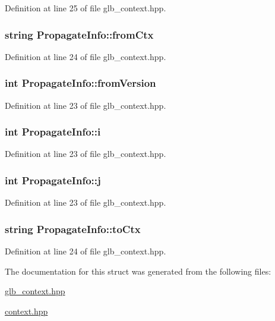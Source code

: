Definition at line 25 of file glb\_\-context.hpp.\hypertarget{struct_propagate_info_a8d941df737a95b7eae658478422ff1c4}{
\subsubsection[{fromCtx}]{\setlength{\rightskip}{0pt plus 5cm}string {\bf PropagateInfo::fromCtx}}}
\label{struct_propagate_info_a8d941df737a95b7eae658478422ff1c4}


Definition at line 24 of file glb\_\-context.hpp.\hypertarget{struct_propagate_info_a397493e2b12ee4f2922f4411dc2ee75a}{
\subsubsection[{fromVersion}]{\setlength{\rightskip}{0pt plus 5cm}int {\bf PropagateInfo::fromVersion}}}
\label{struct_propagate_info_a397493e2b12ee4f2922f4411dc2ee75a}


Definition at line 23 of file glb\_\-context.hpp.\hypertarget{struct_propagate_info_a42a9fbf00adf4661b3a291915bbe4182}{
\subsubsection[{i}]{\setlength{\rightskip}{0pt plus 5cm}int {\bf PropagateInfo::i}}}
\label{struct_propagate_info_a42a9fbf00adf4661b3a291915bbe4182}


Definition at line 23 of file glb\_\-context.hpp.\hypertarget{struct_propagate_info_ac096d4c40115dd5e9909e765ec09c4ca}{
\subsubsection[{j}]{\setlength{\rightskip}{0pt plus 5cm}int {\bf PropagateInfo::j}}}
\label{struct_propagate_info_ac096d4c40115dd5e9909e765ec09c4ca}


Definition at line 23 of file glb\_\-context.hpp.\hypertarget{struct_propagate_info_ae9d0d464b1bbd144e2ba1a1ebd4e0382}{
\subsubsection[{toCtx}]{\setlength{\rightskip}{0pt plus 5cm}string {\bf PropagateInfo::toCtx}}}
\label{struct_propagate_info_ae9d0d464b1bbd144e2ba1a1ebd4e0382}


Definition at line 24 of file glb\_\-context.hpp.

The documentation for this struct was generated from the following files:\begin{DoxyCompactItemize}
\item 
\hyperlink{glb__context_8hpp}{glb\_\-context.hpp}\item 
\hyperlink{context_8hpp}{context.hpp}\end{DoxyCompactItemize}
